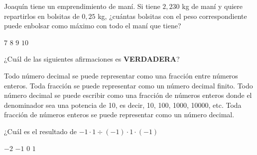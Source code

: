 \documentclass[spanish,letterpaper, 12pt, addpoints, answers]{exam}
\begin{document}
\begin{questions}
    \question[1] Joaquín tiene un emprendimiento de maní. Si tiene $2,230$ kg de maní y quiere repartirlos en bolsitas de $0,25$ kg, ¿cuántas bolsitas con el peso correspondiente puede enbolsar como máximo con todo el maní que tiene?
    \begin{choices}
        \choice $7$
        \CorrectChoice $8$
        \choice $9$
        \choice $10$
    \end{choices}
    \vspace{0.15in}

    \question[1] ¿Cuál de las siguientes afirmaciones es \textbf{VERDADERA}?

    \begin{choices}
        \choice Todo número decimal se puede representar como una fracción entre números enteros.
        \choice Toda fracción se puede representar como un número decimal finito.
        \choice Todo número decimal se puede escribir como una fracción de números enteros donde el denominador sea una potencia de 10, es decir, 10, 100, 1000, 10000, etc.
        \CorrectChoice Toda fracción de números enteros se puede representar como un número decimal.
    \end{choices}
    \vspace{0.15in}

    \question[1] ¿Cuál es el resultado de $-1\cdot 1\div (-1)\cdot 1\cdot (-1)$
    \begin{choices}
        \choice $-2$
        \CorrectChoice $-1$
        \choice $0$
        \choice $1$
    \end{choices}
    \vspace{0.15in}

\end{questions}
\end{document}
